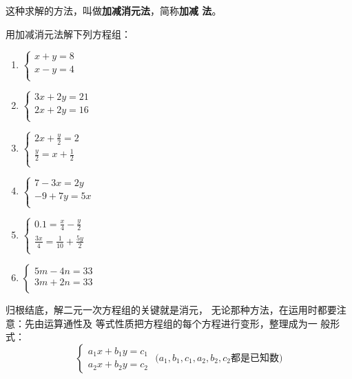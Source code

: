 这种求解的方法，叫做\textbf{加减消元法}，简称\textbf{加减
法}。

\begin{ex}
    用加减消元法解下列方程组：
\begin{multicols}{2}
\begin{enumerate}
    \item $\begin{cases}
        x  +  y  = 8  \\ x  -  y  = 4  \\
    \end{cases}$
    \item $\begin{cases}
       3 x  +  2y  =21   \\ 2x  + 2 y  = 16  \\
    \end{cases}$
    \item $\begin{cases}
       2 x  +  \frac{y}{2}  = 2  \\ \frac{y}{2} =x +\frac{1}{2}       \\
    \end{cases}$
    \item $\begin{cases}
      7- 3 x =2  y    \\ -9+ 7 y  =5x   \\
    \end{cases}$
    \item $\begin{cases}
       0.1=\frac{x}{4} -\frac{y}{2}   \\ \frac{3x}{4}=\frac{1}{10}+\frac{5y}{2}   \\
    \end{cases}$
    \item $\begin{cases}
      5m-4n  = 33  \\3m+2n= 33  \\
    \end{cases}$
\end{enumerate}
\end{multicols}
\end{ex}

归根结底，解二元一次方程组的关键就是消元，
无论那种方法，在运用时都要注意：先由运算通性及
等式性质把方程组的每个方程进行变形，整理成为一
般形式：
\[\begin{cases}
    a_1x+b_1y=c_1\\
    a_2x+b_2y=c_2
\end{cases} \text{ ($a_1,b_1,c_1,a_2,b_2,c_2$都是已知数)}\]

